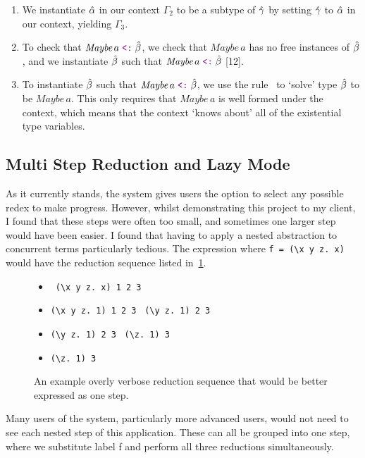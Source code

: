 \begin{enumerate}
    \item We instantiate $\hat{\alpha}$ in our context $\Gamma_2$ to be a subtype of $\hat{\gamma}$ by setting $\hat{\gamma}$ to $\hat{\alpha}$ in our context, yielding $\Gamma_3$.
    \item To check that $\textit{Maybe}\,a \subtype \bhat$, we check that $\textit{Maybe}\,a$ has no free instances of $\hat{\beta}$, and we instantiate $\hat{\beta}$ such that $\textit{Maybe}\,a \subtype \bhat$ [12].
    \item To instantiate $\hat{\beta}$ such that $\textit{Maybe}\,a \subtype \bhat$, we use the rule \InstRSolve\ to `solve' type $\hat{\beta}$ to be $\textit{Maybe}\,a$. This only requires that $\textit{Maybe}\,a$ is well formed under the context, which means that the context `knows about' all of the existential type variables. %
\end{enumerate}

\subsection{Multi Step Reduction and Lazy Mode}
As it currently stands, the system gives users the option to select any possible redex to make progress. However, whilst demonstrating this project to my client, I found that these steps were often too small, and sometimes one larger step would have been easier. I found that having to apply a nested abstraction to concurrent terms particularly tedious. The expression  where \verb|f = (\x y z. x)| would have the reduction sequence listed in~\ref{c2:multi_step_reduction}. 
\begin{figure} %
\begin{itemize}
    \item {} \arr\ \verb|(\x y z. x) 1 2 3|
    \item \verb|(\x y z. 1) 1 2 3| \arr\ \verb|(\y z. 1) 2 3|
    \item \verb|(\y z. 1) 2 3| \arr\ \verb|(\z. 1) 3|
    \item \verb|(\z. 1) 3| \arr\ 
\end{itemize}
\caption{An example overly verbose reduction sequence that would be better expressed as one step.}
\label{c2:multi_step_reduction}
\end{figure}
\noindent Many users of the system, particularly more advanced users, would not need to see each nested step of this application. These can all be grouped into one step, where we substitute label f and perform all three reductions simultaneously. 


